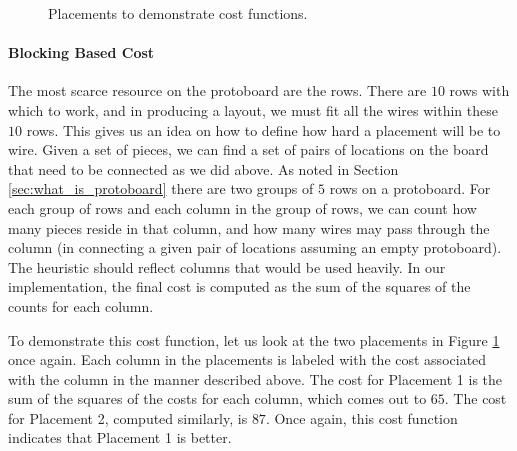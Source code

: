 \begin{figure}[H]
\centering
{}
\caption{Placements to demonstrate cost functions.}
\label{fig:placement_costs}
\end{figure}

\paragraph{Blocking Based Cost}
The most scarce resource on the protoboard are the rows. There are $10$ rows
with which to work, and in producing a layout, we must fit all the wires within
these $10$ rows. This gives us an idea on how to define how hard a placement
will be to wire. Given a set of pieces, we can find a set of pairs of locations
on the board that need to be connected as we did above.
As noted in Section \ref{sec:what_is_protoboard} there are two groups of $5$
rows on a protoboard. For each group of rows and each column in the group of
rows, we can count how many pieces reside in that column, and how many wires may
pass through the column (in connecting a given pair of locations assuming an
empty protoboard). The heuristic should reflect columns that
would be used heavily. In our implementation, the final cost is computed as
the sum of the squares of the counts for each column.

To demonstrate this cost function, let us look at the two placements in Figure
\ref{fig:placement_costs} once again. Each column in the placements is labeled
with the cost associated with the column in the manner described above. The cost
for Placement 1 is the sum of the squares of the costs for each column, which
comes out to $65$. The cost for Placement 2, computed similarly, is $87$. Once
again, this cost function indicates that Placement 1 is better.

